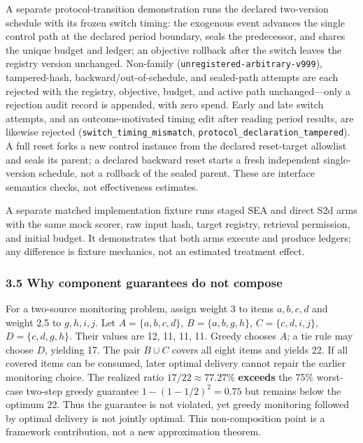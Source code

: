 \documentclass[
  11pt]{article}
\begin{document}
A separate protocol-transition demonstration runs the declared
two-version schedule with its frozen switch timing: the exogenous event
advances the single control path at the declared period boundary, seals
the predecessor, and shares the unique budget and ledger; an objective
rollback after the switch leaves the registry version unchanged.
Non-family (\texttt{unregistered-arbitrary-v999}), tampered-hash,
backward/out-of-schedule, and sealed-path attempts are each rejected
with the registry, objective, budget, and active path unchanged---only a
rejection audit record is appended, with zero spend. Early and late
switch attempts, and an outcome-motivated timing edit after reading
period results, are likewise rejected
(\texttt{switch\_timing\_mismatch},
\texttt{protocol\_declaration\_tampered}). A full reset forks a new
control instance from the declared reset-target allowlist and seals its
parent; a declared backward reset starts a fresh independent
single-version schedule, not a rollback of the sealed parent. These are
interface semantics checks, not effectiveness estimates.

A separate matched implementation fixture runs staged SEA and direct S2d
arms with the same mock scorer, raw input hash, target registry,
retrieval permission, and initial budget. It demonstrates that both arms
execute and produce ledgers; any difference is fixture mechanics, not an
estimated treatment effect.

\subsubsection{3.5 Why component guarantees do not
compose}\label{why-component-guarantees-do-not-compose}

For a two-source monitoring problem, assign weight 3 to items
\(a,b,c,d\) and weight 2.5 to \(g,h,i,j\). Let \(A=\{a,b,c,d\}\),
\(B=\{a,b,g,h\}\), \(C=\{c,d,i,j\}\), \(D=\{c,d,g,h\}\). Their values
are 12, 11, 11, 11. Greedy chooses \(A\); a tie rule may choose \(D\),
yielding 17. The pair \(B\cup C\) covers all eight items and yields 22.
If all covered items can be consumed, later optimal delivery cannot
repair the earlier monitoring choice. The realized ratio
\(17/22\approx77.27\%\) \textbf{exceeds} the 75\% worst-case two-step
greedy guarantee \(1-(1-1/2)^2=0.75\) but remains below the optimum 22.
Thus the guarantee is not violated, yet greedy monitoring followed by
optimal delivery is not jointly optimal. This non-composition point is a
framework contribution, not a new approximation theorem.
\end{document}
